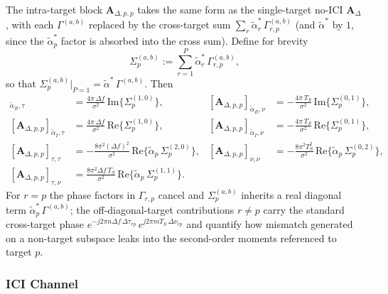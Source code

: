 \documentclass[11pt]{article}
\begin{document}
The intra-target block \(\bm{A}_{\Delta, p,p}\) takes the same form as the single-target no-ICI \(\bm{A}_\Delta\), with each \(\Gamma^{(a,b)}\) replaced by the cross-target sum \(\sum_r \tilde{\alpha}_r^*\, \Gamma_{r,p}^{(a,b)}\) (and \(\tilde{\alpha}^*\) by \(1\), since the \(\tilde{\alpha}_p^*\) factor is absorbed into the cross sum). Define for brevity
\begin{equation}
    \Sigma_p^{(a,b)} := \sum_{r=1}^{P} \tilde{\alpha}_r^*\, \Gamma_{r,p}^{(a,b)},
\end{equation}
so that \(\Sigma_p^{(a,b)}\big|_{P=1} = \tilde{\alpha}^*\, \Gamma^{(a,b)}\). Then
\begin{align}
    [\bm{A}_{\Delta, p,p}]_{\tilde{\alpha}_R, \tau} &= \tfrac{4\pi\, \Delta f}{\sigma^2}\, \mathrm{Im}\{\Sigma_p^{(1,0)}\}, &
    [\bm{A}_{\Delta, p,p}]_{\tilde{\alpha}_R, \nu} &= -\tfrac{4\pi\, T_S}{\sigma^2}\, \mathrm{Im}\{\Sigma_p^{(0,1)}\}, \\
    [\bm{A}_{\Delta, p,p}]_{\tilde{\alpha}_I, \tau} &= \tfrac{4\pi\, \Delta f}{\sigma^2}\, \mathrm{Re}\{\Sigma_p^{(1,0)}\}, &
    [\bm{A}_{\Delta, p,p}]_{\tilde{\alpha}_I, \nu} &= -\tfrac{4\pi\, T_S}{\sigma^2}\, \mathrm{Re}\{\Sigma_p^{(0,1)}\}, \\
    [\bm{A}_{\Delta, p,p}]_{\tau, \tau} &= -\tfrac{8\pi^2 (\Delta f)^2}{\sigma^2}\, \mathrm{Re}\{\tilde{\alpha}_p\, \Sigma_p^{(2,0)}\}, &
    [\bm{A}_{\Delta, p,p}]_{\nu, \nu} &= -\tfrac{8\pi^2 T_S^2}{\sigma^2}\, \mathrm{Re}\{\tilde{\alpha}_p\, \Sigma_p^{(0,2)}\}, \\
    [\bm{A}_{\Delta, p,p}]_{\tau, \nu} &= \tfrac{8\pi^2 \Delta f\, T_S}{\sigma^2}\, \mathrm{Re}\{\tilde{\alpha}_p\, \Sigma_p^{(1,1)}\}. & &
\end{align}
For \(r = p\) the phase factors in \(\Gamma_{r,p}\) cancel and \(\Sigma_p^{(a,b)}\) inherits a real diagonal term \(\tilde{\alpha}_p^*\, \Gamma^{(a,b)}\); the off-diagonal-target contributions \(r \neq p\) carry the standard cross-target phase \(e^{-j2\pi n\Delta f\, \Delta\tau_{rp}}\, e^{j2\pi mT_S\, \Delta\nu_{rp}}\) and quantify how mismatch generated on a non-target subspace leaks into the second-order moments referenced to target \(p\).

\subsubsection{ICI Channel}
\end{document}
